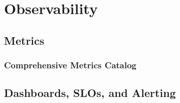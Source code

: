 \documentclass[a4paper,twoside]{sapthesis}
\begin{document}
\chapter{Observability}
\label{ch:observability}


\section{Metrics}
\label{sec:metrics}

\subsection{Comprehensive Metrics Catalog}
%
%
%
%
%
%
%

\section{Dashboards, SLOs, and Alerting}
\label{sec:dashboards-slos-alerting}
\end{document}
